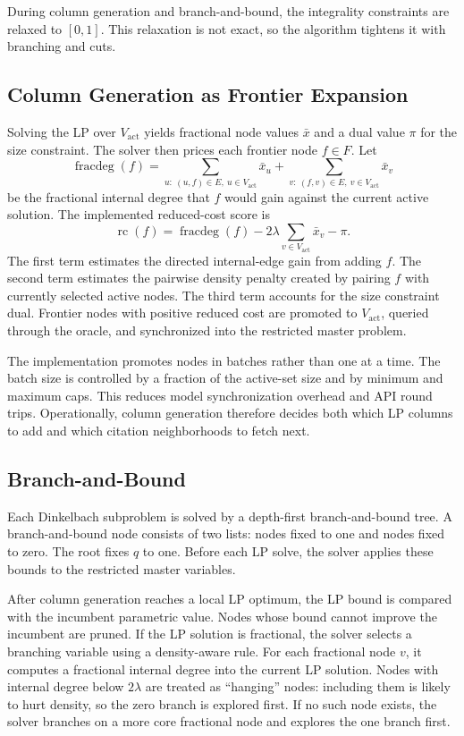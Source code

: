 \documentclass[11pt]{article}
\newcommand{\Vactive}{V_{\mathrm{act}}}
\newcommand{\frontier}{F}
\begin{document}
During column generation and branch-and-bound, the integrality constraints are
relaxed to $[0,1]$. This relaxation is not exact, so the algorithm tightens it
with branching and cuts.

\subsection{Column Generation as Frontier Expansion}

Solving the LP over $\Vactive$ yields fractional node values $\bar{x}$ and a
dual value $\pi$ for the size constraint. The solver then prices each frontier
node $f\in\frontier$. Let
\[
  \operatorname{fracdeg}(f)
  =
  \sum_{u:\ (u,f)\in E,\ u\in\Vactive} \bar{x}_u
  +
  \sum_{v:\ (f,v)\in E,\ v\in\Vactive} \bar{x}_v
\]
be the fractional internal degree that $f$ would gain against the current active
solution. The implemented reduced-cost score is
\begin{equation}
  \operatorname{rc}(f)
  =
  \operatorname{fracdeg}(f)
  -2\lambda\sum_{v\in\Vactive}\bar{x}_v
  -\pi.
  \label{eq:pricing}
\end{equation}
The first term estimates the directed internal-edge gain from adding $f$. The
second term estimates the pairwise density penalty created by pairing $f$ with
currently selected active nodes. The third term accounts for the size constraint
dual. Frontier nodes with positive reduced cost are promoted to $\Vactive$,
queried through the oracle, and synchronized into the restricted master problem.

The implementation promotes nodes in batches rather than one at a time. The
batch size is controlled by a fraction of the active-set size and by minimum and
maximum caps. This reduces model synchronization overhead and API round trips.
Operationally, column generation therefore decides both which LP columns to add
and which citation neighborhoods to fetch next.

\subsection{Branch-and-Bound}

Each Dinkelbach subproblem is solved by a depth-first branch-and-bound tree. A
branch-and-bound node consists of two lists: nodes fixed to one and nodes fixed
to zero. The root fixes $q$ to one. Before each LP solve, the solver applies
these bounds to the restricted master variables.

After column generation reaches a local LP optimum, the LP bound is compared
with the incumbent parametric value. Nodes whose bound cannot improve the
incumbent are pruned. If the LP solution is fractional, the solver selects a
branching variable using a density-aware rule. For each fractional node $v$, it
computes a fractional internal degree into the current LP solution. Nodes with
internal degree below $2\lambda$ are treated as ``hanging'' nodes: including them
is likely to hurt density, so the zero branch is explored first. If no such node
exists, the solver branches on a more core fractional node and explores the one
branch first.
\end{document}
